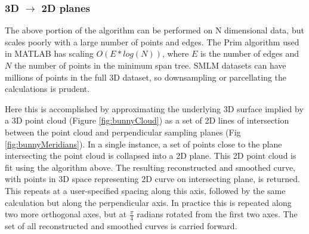 \documentclass[10pt,a4paper]{article}
\begin{document}
\subsubsection{3D $\rightarrow$ 2D planes}

The above portion of the algorithm can be performed on N dimensional data, but scales poorly with a large number of points and edges.  The Prim algorithm used in MATLAB has scaling $O(E*log(N))$, where $E$ is the number of edges and $N$ the number of points in the minimum span tree.  SMLM datasets can have millions of points in the full 3D dataset, so downsampling or parcellating the calculations is prudent. 

Here this is accomplished by approximating the underlying 3D surface implied by a 3D point cloud (Figure \ref{fig:bunnyCloud}) as a set of 2D lines of intersection between the point cloud and perpendicular sampling planes (Fig \ref{fig:bunnyMeridians}).  In a single instance, a set of points close to the plane intersecting the point cloud is collapsed into a 2D plane.  This 2D point cloud is fit using the algorithm above.  The resulting reconstructed and smoothed curve, with points in 3D space representing 2D curve on intersecting plane, is returned.  This repeats at a user-specified spacing along this axis, followed by the same calculation but along the perpendicular axis.  In practice this is repeated along two more orthogonal axes, but at $\frac{\pi}{4}$ radians rotated from the first two axes.  The set of all reconstructed and smoothed curves is carried forward. 
\end{document}
